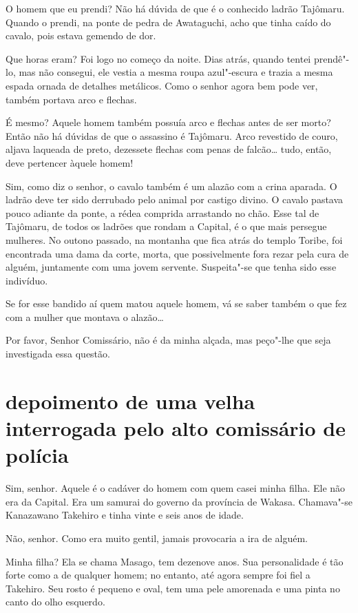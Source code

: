 O homem que eu prendi? Não há dúvida de que é o conhecido ladrão
Tajômaru. Quando o prendi, na ponte de pedra de Awataguchi, acho que
tinha caído do cavalo, pois estava gemendo de dor.

Que horas eram? Foi logo no começo da noite. Dias atrás, quando tentei
prendê"-lo, mas não consegui, ele vestia a mesma roupa azul"-escura e
trazia a mesma espada ornada de detalhes metálicos. Como o senhor agora
bem pode ver, também portava arco e flechas.

É mesmo? Aquele homem também possuía arco e flechas antes de ser morto?
Então não há dúvidas de que o assassino é Tajômaru. Arco revestido de
couro, aljava laqueada de preto, dezessete flechas com penas de
falcão\ldots{} tudo, então, deve pertencer àquele homem!

Sim, como diz o senhor, o cavalo também é um alazão com a crina aparada.
O ladrão deve ter sido derrubado pelo animal por castigo divino. O
cavalo pastava pouco adiante da ponte, a rédea comprida arrastando no
chão. Esse tal de Tajômaru, de todos os ladrões que rondam a Capital, é
o que mais persegue mulheres. No outono passado, na montanha que fica
atrás do templo Toribe, foi encontrada uma dama da corte, morta, que
possivelmente fora rezar pela cura de alguém, juntamente com uma jovem
servente. Suspeita"-se que tenha sido esse indivíduo.

Se for esse bandido aí quem matou aquele homem, vá se saber também o que
fez com a mulher que montava o alazão…

Por favor, Senhor Comissário, não é da minha alçada, mas peço"-lhe que
seja investigada essa questão.

\section*{depoimento de uma velha interrogada pelo alto comissário de polícia}

Sim, senhor. Aquele é o cadáver do homem com quem casei minha filha. Ele
não era da Capital. Era um samurai do governo da província de Wakasa.
Chamava"-se Kanazawano Takehiro e tinha vinte e seis anos de idade.

Não, senhor. Como era muito gentil, jamais provocaria a ira de alguém.

Minha filha? Ela se chama Masago, tem dezenove anos. Sua personalidade é
tão forte como a de qualquer homem; no entanto, até agora sempre foi
fiel a Takehiro. Seu rosto é pequeno e oval, tem uma pele amorenada e
uma pinta no canto do olho esquerdo.

